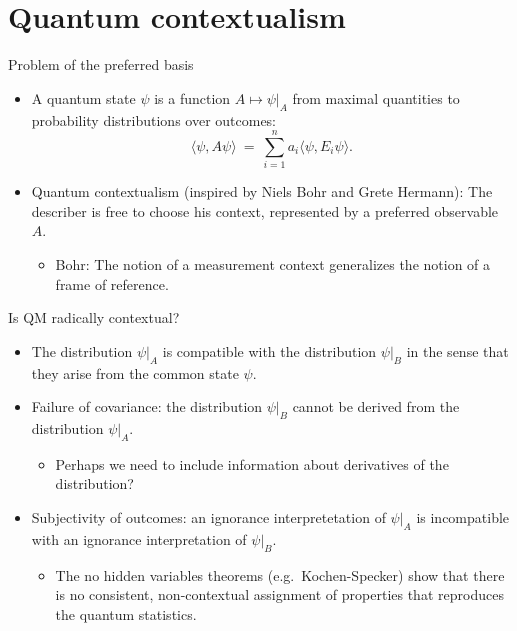 \documentclass[fleqn]{beamer}
\begin{document}
\section{Quantum contextualism}


\begin{frame}{Problem of the preferred basis}

  \begin{itemize}

  \item A quantum state $\psi$ is a function $A\mapsto \psi |_A$ from
    maximal quantities to probability distributions over outcomes:
    \[ \langle \psi ,A\psi \rangle \: =\: \sum _{i=1}^n a_i\langle
      \psi ,E_i\psi \rangle .\]

  \item Quantum contextualism (inspired by Niels Bohr and Grete
    Hermann): The describer is free to choose his context, represented
    by a preferred observable $A$.

    \begin{itemize}
    \item Bohr: The notion of a measurement context generalizes the
      notion of a frame of reference.
    \end{itemize}

  \end{itemize}

\end{frame}


\begin{frame}{Is QM radically contextual?}
  
\begin{itemize}  

\item The distribution $\psi |_A$ is compatible with the distribution
  $\psi |_B$ in the sense that they arise from the common state
  $\psi$.

\item Failure of covariance: the distribution $\psi |_B$ cannot be
  derived from the distribution $\psi |_A$.
  \begin{itemize}
  \item Perhaps we need to include information about derivatives of
    the distribution?
  \end{itemize}

\item Subjectivity of outcomes: an ignorance interpretetation of
  $\psi |_A$ is incompatible with an ignorance interpretation of
  $\psi |_B$.

  \begin{itemize}
  \item The no hidden variables theorems (e.g.~Kochen-Specker) show
    that there is no consistent, non-contextual assignment of
    properties that reproduces the quantum statistics.
  \end{itemize}
  
\end{itemize}

\end{frame}
\end{document}
